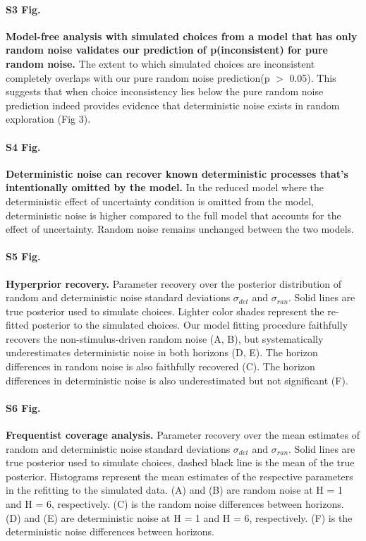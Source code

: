 \documentclass[12pt]{article}
\begin{document}
{\paragraph*{S3 Fig.}
\label{S3_Fig}
{\bf Model-free analysis with simulated choices from a model that has only random noise validates our prediction of p(inconsistent) for pure random noise.} The extent to which simulated choices are inconsistent completely overlaps with our pure random noise prediction(p $>$ 0.05). This suggests that when choice inconsistency lies below the pure random noise prediction indeed provides evidence that deterministic noise exists in random exploration (Fig 3).

\paragraph*{S4 Fig.}
\label{S4_Fig}
{\bf Deterministic noise can recover known deterministic processes that's intentionally omitted by the model.} In the reduced model where the deterministic effect of uncertainty condition is omitted from the model, deterministic noise is higher compared to the full model that accounts for the effect of uncertainty. Random noise remains unchanged between the two models.

\paragraph*{S5 Fig.}
\label{S5_Fig}
{\bf Hyperprior recovery.}
Parameter recovery over the posterior distribution of random and deterministic noise standard deviations $\sigma_{det}$ and $\sigma_{ran}$. Solid lines are true posterior used to simulate choices. Lighter color shades represent the re-fitted posterior to the simulated choices. Our model fitting procedure faithfully recovers the non-stimulus-driven random noise (A, B), but systematically underestimates deterministic noise in both horizons (D, E). The horizon differences in random noise is also faithfully recovered (C). The horizon differences in deterministic noise is also underestimated but not significant (F).

\paragraph*{S6 Fig.}
\label{S6_Fig}
{\bf Frequentist coverage analysis.}
Parameter recovery over the mean estimates of random and deterministic noise standard deviations $\sigma_{det}$ and $\sigma_{ran}$. Solid lines are true posterior used to simulate choices, dashed black line is the mean of the true posterior. Histograms represent the mean estimates of the respective parameters in the refitting to the simulated data. (A) and (B) are random noise at H = 1 and H = 6, respectively. (C) is the random noise differences between horizons. (D) and (E) are deterministic noise at H = 1 and H = 6, respectively. (F) is the deterministic noise differences between horizons.

}
\end{document}
